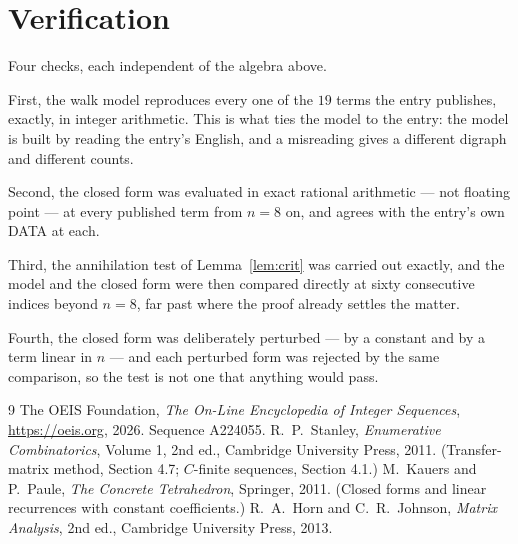 \documentclass[11pt,a4paper]{article}
\theoremstyle{plain}
\theoremstyle{definition}
\begin{document}
\section{Verification}

Four checks, each independent of the algebra above.

First, the walk model reproduces every one of the $19$ terms the entry publishes,
exactly, in integer arithmetic. This is what ties the model to the entry: the model is built
by reading the entry's English, and a misreading gives a different digraph and different
counts.

Second, the closed form was evaluated in exact rational arithmetic --- not floating point ---
at every published term from $n=8$ on, and agrees with the entry's own DATA at each.

Third, the annihilation test of Lemma~\ref{lem:crit} was carried out exactly, and the model
and the closed form were then compared directly at sixty consecutive indices beyond
$n=8$, far past where the proof already settles the matter.

Fourth, the closed form was deliberately perturbed --- by a constant and by a term linear in
$n$ --- and each perturbed form was rejected by the same comparison, so the test is not one
that anything would pass.

\begin{thebibliography}{9}
 The OEIS Foundation, \emph{The On-Line Encyclopedia of Integer
Sequences}, \url{https://oeis.org}, 2026. Sequence A224055.
 R.~P.~Stanley, \emph{Enumerative Combinatorics}, Volume 1, 2nd ed.,
Cambridge University Press, 2011. (Transfer-matrix method, Section 4.7; $C$-finite sequences,
Section 4.1.)
 M.~Kauers and P.~Paule, \emph{The Concrete Tetrahedron}, Springer, 2011.
(Closed forms and linear recurrences with constant coefficients.)
 R.~A.~Horn and C.~R.~Johnson, \emph{Matrix Analysis}, 2nd ed., Cambridge
University Press, 2013.
\end{thebibliography}
\end{document}

